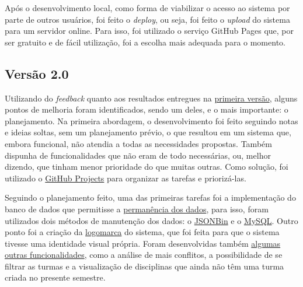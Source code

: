 Após o desenvolvimento local, como forma de viabilizar o acesso ao sistema por parte de outros usuários, foi feito o \textit{deploy}, ou seja, foi feito o \textit{upload} do sistema para um servidor online. Para isso, foi utilizado o serviço GitHub Pages que, por ser gratuito e de fácil utilização, foi a escolha mais adequada para o momento.


\subsection{Versão 2.0} \label{subsec:MVP2} %

Utilizando do \textit{feedback} quanto aos resultados entregues na \hyperref[subsec:MVP1]{primeira versão}, alguns pontos de melhoria foram identificados, sendo um deles, e o mais importante: o planejamento. Na primeira abordagem, o desenvolvimento foi feito seguindo notas e ideias soltas, sem um planejamento prévio, o que resultou em um sistema que, embora funcional, não atendia a todas as necessidades propostas. Também dispunha de funcionalidades que não eram de todo necessárias, ou, melhor dizendo, que tinham menor prioridade do que muitas outras. Como solução, foi utilizado o \hyperref[sssec:GitHub Projects]{GitHub Projects} para organizar as tarefas e priorizá-las.



Seguindo o planejamento feito, uma das primeiras tarefas foi a implementação do banco de dados que permitisse a \hyperref[sssec:Permanência dos Dados]{permanência dos dados}, para isso, foram utilizados dois métodos de manutenção dos dados: o \hyperref[ssssec:JSONBin]{JSONBin} e o \hyperref[ssssec:MySQL]{MySQL}. Outro ponto foi a criação da \hyperref[sssec:Logomarca]{logomarca} do sistema, que foi feita para que o sistema tivesse uma identidade visual própria. Foram desenvolvidas também \hyperref[sssec:Funcionalidades Adicionais]{algumas outras funcionalidades}, como a análise de mais conflitos, a possibilidade de se filtrar as turmas e a visualização de disciplinas que ainda não têm uma turma criada no presente semestre.

